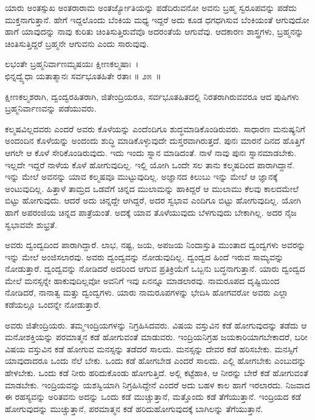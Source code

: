 ಯಾರು ಅಂತಸ್ಸುಖ ಅಂತರಾರಾಮ ಅಂತರ್ಜ್ಯೋತಿಯನ್ನು ಪಡೆದಿರುವನೋ ಅವನು ಬ್ರಹ್ಮ ಸ್ವರೂಪವನ್ನು ಪಡೆದು ಮುಕ್ತನಾಗುತ್ತಾನೆ. ಹೇಗೆ ಇದ್ದಲೊಂದು ಬೆಂಕಿಯ ಮಧ್ಯ ಇದ್ದರೆ ಅದು ಕೂಡ ಧಗಧಗಿಸುವ ಬೆಂಕಿಯಂತೆ ಆಗುವುದೋ ಹಾಗೆ ಯಾವುದನ್ನು ನಾವು ಕುರಿತು ಚಿಂತಿಸುತ್ತಿರುವೆವೊ ಅದರಂತೆಯೆ ಆಗುವೆವು. ಆದಕಾರಣ ಶಾಸ್ತ್ರಗಳು, ಬ್ರಹ್ಮನನ್ನು ಚಿಂತಿಸುತ್ತಿದ್ದರೆ ಬ್ರಹ್ಮನೇ ಆಗುವನು ಎಂದು ಸಾರುವುವು. 

\begin{shloka}
ಲಭಂತೇ ಬ್ರಹ್ಮನಿರ್ವಾಣಮೃಷಯಃ ಕ್ಷೀಣಕಲ್ಮಷಾಃ~।\\ಛಿನ್ನದ್ವ್ಯೆಧಾ ಯತಾತ್ಮಾನಃ ಸರ್ವಭೂತಹಿತೇ ರತಾಃ \hfill॥ ೨೫~॥
\end{shloka}

\begin{artha}
ಕ್ಷೀಣಕಲ್ಮಶರಾಗಿ, ದ್ವಂದ್ವರಹಿತರಾಗಿ, ಜಿತೇಂದ್ರಿಯರೂ, ಸರ್ವಭೂತಹಿತದಲ್ಲಿ ನಿರತರಾಗಿರುವವರೂ ಆದ ಪುಷಿಗಳು ಬ್ರಹ್ಮನಿರ್ವಾಣವನ್ನು ಪಡೆಯುವರು.
\end{artha}

ಕಲ್ಮಷವಿಲ್ಲದವರು ಎಂದರೆ ಅವರು ಕೊಳೆಯನ್ನು ಎಂದೆಂದಿಗೂ ಶುದ್ಧಮಾಡಿಕೊಂಡಿರುವರು. ಸಾಧಾರಣ ಮನುಷ್ಯನಿಗೆ ಅಂದಂದಿನ ಕೊಳೆಯನ್ನು ಅಂದಂದು ಶುದ್ಧಿ ಮಾಡಿಕೊಳ್ಳುವುದೇ ದುಸ್ತರವಾಗಿರುತ್ತದೆ. ಪುನಃ ಮಾರನೆ ದಿನದ ಹೊತ್ತಿಗೆ ಆಗಲೇ ಆ ಕೊಳೆ ಸೇರಿಕೊಂಡಿರುವುದು. ಇದು ಇಂದು ಸ್ನಾನ ಮಾಡಿದಂತೆ. ನಾಳೆ ನಾವು ಪುನಃ ಸ್ನಾನಮಾಡಬೇಕು. ಇಲ್ಲದೇ ಇದ್ದರೆ ನಾಳೆಯ ಕೊಳೆ ಹೋಗುವುದಿಲ್ಲ. ಇಲ್ಲಿ ಯೋಗಿ ಒಂದೇ ಸಲ ತಾನು ಕಲ್ಮಷದಿಂದ ಪಾರಾಗಿದ್ದಾನೆ. ಇನ್ನು ಮೇಲೆ ಅವನನ್ನು ಯಾವ ಕಲ್ಮಷವೂ ಮುಟ್ಟುವುದಿಲ್ಲ. ಅಜ್ಞಾನದ ಕಿಲುಬು ಇನ್ನು ಮೇಲೆ ಆ ಜ್ಞಾನಕ್ಕೆ ಅಂಟುವುದಿಲ್ಲ. ಹಿತ್ತಾಳೆ ತಾಮ್ರದ ಒಡವೆಗೆ ಚಿನ್ನದ ಮುಲಾಮನ್ನು ಹಾಕಿದ್ದರೆ ಆ ಮುಲಾಮು ಕೆಲವು ಕಾಲದಮೇಲೆ ಬಿಟ್ಟು ಹೋಗುವುದು. ಆದರೆ ಅದು ಚಿನ್ನದ್ದೇ ಆಗಿದ್ದರೆ, ಅದರ ಸ್ವಭಾವ ಎಂದಿಗೂ ಬಿಟ್ಟು ಹೋಗುವುದಿಲ್ಲ. ಯೋಗಿ ಹಾಗೆ ಅಪರಂಜಿಯ ಚಿನ್ನದ ಪಾತ್ರೆಯಂತೆ. ಅದಕ್ಕೆ ಯಾವ ತೊಳೆಯುವುದು ಬೆಳಗುವುದು ಬೇಕಾಗಿಲ್ಲ. ಅದರ ನೈಜ ಸ್ವಭಾವವೇ ಶುಭ್ರತೆ.

ಅವರು ದ್ವಂದ್ವದಿಂದ ಪಾರಾಗಿದ್ದಾರೆ. ಲಾಭ, ನಷ್ಟ, ಜಯ, ಅಪಜಯ ನಿಂದಾಸ್ತುತಿ ಮುಂತಾದ ದ್ವಂದ್ವಗಳು ಅವರನ್ನು ಇನ್ನು ಮೇಲೆ ಅಂಜಿಸಲಾರವು. ಅವರು ದ್ವಂದ್ವವನ್ನು ನೋಡುವುದಿಲ್ಲ. ದ್ವಂದ್ವದ ಹಿಂದೆ ಇರುವ ಸಾಮ್ಯವನ್ನು ನೋಡುತ್ತಾರೆ. ದ್ವಂದ್ವವನ್ನು ನೋಡಿದರೆ ಅದರಿಂದ ಆಗುವ ಪ್ರತಿಕ್ರಿಯೆಗೆ ಒಬ್ಬನು ಬದ್ಧನಾಗುತ್ತಾನೆ. ಯಾರು ದ್ವಂದ್ವದ ಮೇಲೆ ಮನಸ್ಸನ್ನೇ ಹಾಕುವುದಿಲ್ಲವೋ ಅವನಿಗೆ ಇವು ಏನನ್ನೂ ಮಾಡಲಾರವು. ನಾಮರೂಪದ ದೃಷ್ಟಿಯಿಂದ ನೋಡಿದರೆ, ನಾನಾತ್ವ ಮತ್ತು ದ್ವಂದ್ವಗಳು. ಯಾರು ನಾಮರೂಪಗಳನ್ನು ಭೇದಿಸಿ ಹೋಗವರೋ ಅವರು ಎಲ್ಲಾ ಕಡೆಯಲ್ಲೂ ಒಂದನ್ನೇ ನೋಡುತ್ತಾರೆ.

ಅವರು ಜಿತೇಂದ್ರಿಯರು. ತಮ್ಮಇಂದ್ರಿಯಗಳನ್ನು ನಿಗ್ರಹಿಸಿದವರು. ವಿಷಯ ವಸ್ತುವಿನ ಕಡೆ ಹೋಗುವುದನ್ನು ತಡೆದು ಆ ಮನೋಶಕ್ತಿಯನ್ನು ಪರಮಾತ್ಮನ ಕಡೆ ಹೋಗುವಂತೆ ಮಾಡುವರು. ಇಂದ್ರಿಯನಿಗ್ರಹ ಜಯಕಾರಿಯಾಗಬೇಕಾದರೆ, ಬರೀ ವಿಷಯ ವಸ್ತುವಿನ ಕಡೆ ಹೋಗುವ ಮನಸ್ಸನ್ನು ತಡೆದರೆ ಸಾಲದು. ಮನಸ್ಸನ್ನು ದೇವರ ಕಡೆ ಹರಿಸಬೇಕು. ಮನಸ್ಸಿಗೆ ಯಾವುದಾದರೂ ಒಂದು ನೆಲೆ ಬೇಕು. ಒಂದು ಕಡೆ ಹೋಗಬೇಡ ಎಂದರೆ ಸಾಲದು. ಎಲ್ಲಿ ಹೋಗಬೇಕು ಎಂಬುದನ್ನು ಹೇಳಬೇಕು. ಒಂದು ಕಡೆ ನೀರು ಹರಿದುಕೊಂಡು ಹೋಗುತ್ತಿದೆ. ಅಲ್ಲಿ ಕಟ್ಟೆಹಾಕಿ, ಆ ನೀರನ್ನು ಬೇರೆ ಕಡೆ ಹೋಗುವಂತೆ ಮಾಡಬೇಕು. ಇಂದ್ರಿಯವನ್ನು ಯಶಸ್ವಿಯಾಗಿ ನಿಗ್ರಹಿಸಿದ್ದೇನೆ ಎಂದರೆ ಅದು ಬಹಳ ಕಾಲ ಹಾಗೆ ಇರಲಾರದು. ನಿಜವಾದ ಈ ರಹಸ್ಯವನ್ನು ಅರಿತವನು ಅದನ್ನು ಒಂದು ಕಡೆ ಮುಚ್ಚುತ್ತಾನೆ, ಮತ್ತೊಂದು ಕಡೆ ತೆಗೆಯುತ್ತಾನೆ. ಇಂದ್ರಿಯದ ಕಡೆ ಹೋಗುವುದನ್ನು ಮುಚ್ಚುತ್ತಾನೆ, ಪರಮಾತ್ಮನ ಕಡೆ ಹರಿದುಹೋಗುವುದಕ್ಕೆ ಬಾಗಿಲನ್ನು ತೆಗೆಯುತ್ತಾನೆ.

